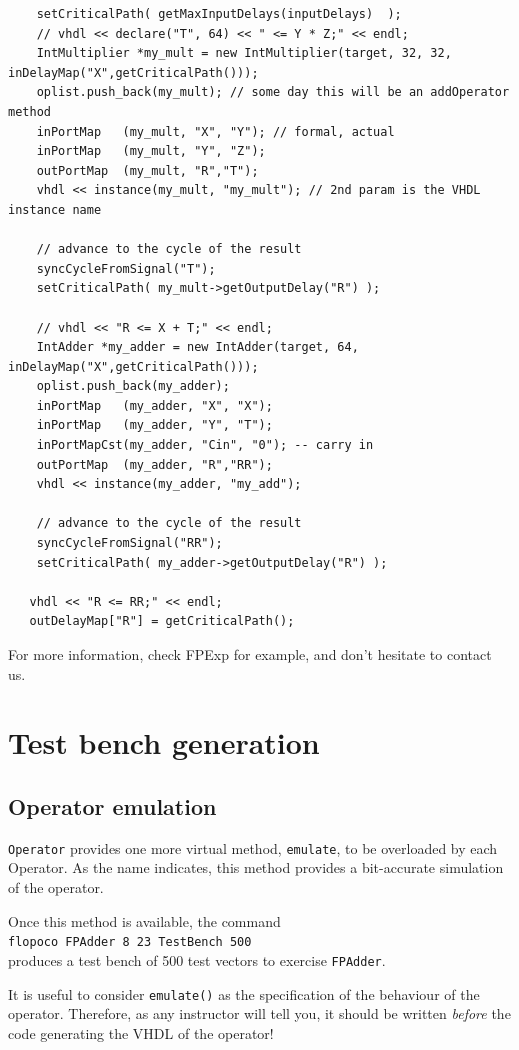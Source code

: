 \documentclass{article}
\begin{document}
\begin{verbatim}
	setCriticalPath( getMaxInputDelays(inputDelays)  );
	// vhdl << declare("T", 64) << " <= Y * Z;" << endl;
	IntMultiplier *my_mult = new IntMultiplier(target, 32, 32, inDelayMap("X",getCriticalPath()));
	oplist.push_back(my_mult); // some day this will be an addOperator method
	inPortMap   (my_mult, "X", "Y"); // formal, actual
	inPortMap   (my_mult, "Y", "Z");
	outPortMap  (my_mult, "R","T");
	vhdl << instance(my_mult, "my_mult"); // 2nd param is the VHDL instance name

	// advance to the cycle of the result
	syncCycleFromSignal("T"); 
	setCriticalPath( my_mult->getOutputDelay("R") );
	
	// vhdl << "R <= X + T;" << endl;
	IntAdder *my_adder = new IntAdder(target, 64, inDelayMap("X",getCriticalPath()));
	oplist.push_back(my_adder);
	inPortMap   (my_adder, "X", "X");
	inPortMap   (my_adder, "Y", "T");
	inPortMapCst(my_adder, "Cin", "0"); -- carry in
	outPortMap  (my_adder, "R","RR");
	vhdl << instance(my_adder, "my_add");

	// advance to the cycle of the result
	syncCycleFromSignal("RR"); 
	setCriticalPath( my_adder->getOutputDelay("R") );
	
   vhdl << "R <= RR;" << endl; 
   outDelayMap["R"] = getCriticalPath();
\end{verbatim}

For more information, check FPExp for example, and
don't hesitate to contact us.


\section{Test bench generation}

\subsection{Operator emulation}

\texttt{Operator} provides one more virtual method, \texttt{emulate},
to be overloaded by each Operator. As the name indicates, this method
provides a bit-accurate simulation of the operator.
 
Once this method is available, the command\\
 \texttt{flopoco FPAdder 8 23 TestBench 500} \\
produces a test bench of 500 test vectors to exercise \texttt{FPAdder}. 

It is useful to consider \texttt{emulate()} as the specification of
the behaviour of the operator. Therefore, as any instructor will tell
you, it should be written \emph{before} the code generating the VHDL
of the operator!
\end{document}
